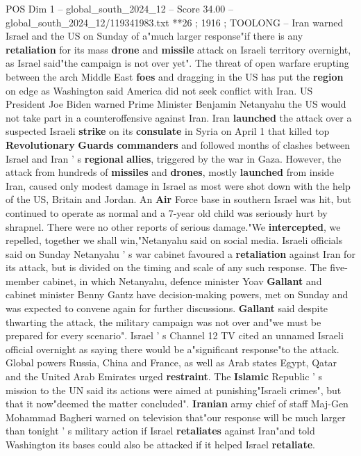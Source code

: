 \begin{textsample}{POS Dim 1 – global\_south\_2024\_12 – Score 34.00 – global\_south\_2024\_12/119341983.txt}  \label{ex:f1_pos_191}
**26 ; 1916 ; TOOLONG -- Iran warned Israel and the US on Sunday of a"much larger response"if there is any \textbf{retaliation} for its mass \textbf{drone} and \textbf{missile} attack on Israeli territory overnight, as Israel said"the campaign is not over yet".
The threat of open warfare erupting between the arch Middle East \textbf{foes} and dragging in the US has put the \textbf{region} on edge as Washington said America did not seek conflict with Iran.
US President Joe Biden warned Prime Minister Benjamin Netanyahu the US would not take part in a counteroffensive against Iran.
Iran \textbf{launched} the attack over a suspected Israeli \textbf{strike} on its \textbf{consulate} in Syria on April 1 that killed top \textbf{Revolutionary} \textbf{Guards} \textbf{commanders} and followed months of clashes between Israel and Iran ' s \textbf{regional} \textbf{allies}, triggered by the war in Gaza.
However, the attack from hundreds of \textbf{missiles} and \textbf{drones}, mostly \textbf{launched} from inside Iran, caused only modest damage in Israel as most were shot down with the help of the US, Britain and Jordan.
An \textbf{Air} Force base in southern Israel was hit, but continued to operate as normal and a 7-year old child was seriously hurt by shrapnel.
There were no other reports of serious damage."We \textbf{intercepted}, we repelled, together we shall win,"Netanyahu said on social media.
Israeli officials said on Sunday Netanyahu ' s war cabinet favoured a \textbf{retaliation} against Iran for its attack, but is divided on the timing and scale of any such response.
The five-member cabinet, in which Netanyahu, defence minister Yoav \textbf{Gallant} and cabinet minister Benny Gantz have decision-making powers, met on Sunday and was expected to convene again for further discussions. \textbf{Gallant} said despite thwarting the attack, the military campaign was not over and"we must be prepared for every scenario".
Israel ' s Channel 12 TV cited an unnamed Israeli official overnight as saying there would be a"significant response"to the attack.
Global powers Russia, China and France, as well as Arab states Egypt, Qatar and the United Arab Emirates urged \textbf{restraint}.
The \textbf{Islamic} Republic ' s mission to the UN said its actions were aimed at punishing"Israeli crimes", but that it now"deemed the matter concluded". \textbf{Iranian} army chief of staff Maj-Gen Mohammad Bagheri warned on television that"our response will be much larger than tonight ' s military action if Israel \textbf{retaliates} against Iran"and told Washington its bases could also be attacked if it helped Israel \textbf{retaliate}.

\end{textsample}
